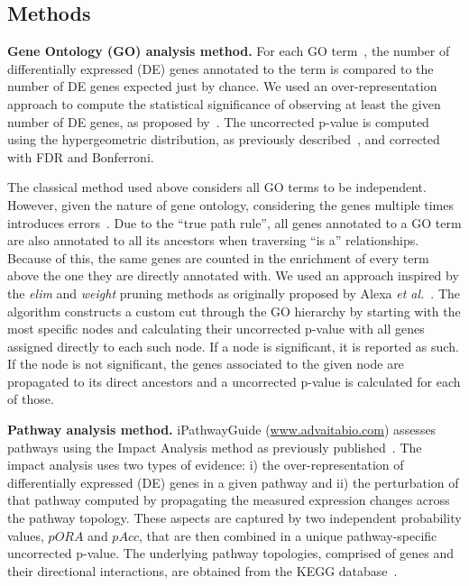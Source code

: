 \subsection{Methods}
\textbf{Gene Ontology (GO) analysis method.}  For each GO term~\cite{ashburner2002ontologies, gene2004gene}, the number of differentially expressed (DE) genes annotated to the term is compared to the number of DE genes expected just by chance. We used  an over-representation approach to compute the statistical significance of observing at least the given number of DE genes, as proposed by~\cite{Tavazoie:1999}. The uncorrected p-value is computed using the hypergeometric distribution, as previously described~\cite{DraghiciOE2:2003, DraghiciBook:2011}, and corrected with FDR and Bonferroni.

The classical method used above considers all GO terms to be independent. However, given the nature of gene ontology, considering the genes multiple times introduces errors~\cite{Rhee:2008, DraghiciBook:2011}. Due to the ``true path rule'', all  genes annotated to a GO term are also annotated to all its ancestors when traversing ``is a'' relationships. Because of this, the same genes are counted in the enrichment of every term above the one they are directly annotated with.  We used an approach inspired by  the \textit{elim} and \emph{weight} pruning methods as originally proposed by Alexa \textit{et al.}~\cite{Alexa:2006}. The algorithm constructs a custom cut through the GO hierarchy by starting with the most specific nodes and calculating their uncorrected p-value with all genes assigned directly to each such node. If a node is significant, it is reported as such. If the node is not significant, the genes associated to the given node are propagated to its direct ancestors and a uncorrected p-value is calculated for each of those. 

\textbf{Pathway analysis method.}  
iPathwayGuide (\url{www.advaitabio.com}) assesses pathways using the Impact Analysis method as previously published~\cite{DraghiciPE:2007, tarca2009novel, khatri2007}. The impact analysis uses two types of evidence: i) the over-representation of differentially expressed (DE) genes in a given pathway and ii) the perturbation of that pathway computed by propagating the measured expression changes across the pathway topology. These aspects are captured by two independent probability values, $pORA$ and $pAcc$, that are then combined in a unique pathway-specific uncorrected p-value. The underlying pathway topologies, comprised of genes and their directional interactions, are obtained from the KEGG database~\cite{ogata1999kegg, kanehisa2010kegg, kanehisa2012kegg,  kanehisa2014data}.

